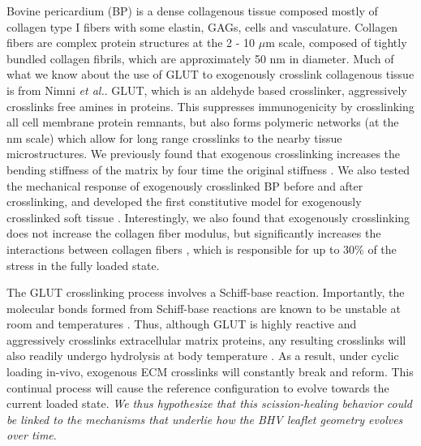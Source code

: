 	Bovine pericardium (BP) is a dense collagenous tissue composed mostly of collagen type I fibers with some elastin, GAGs, cells and vasculature. Collagen fibers are complex protein structures at the 2 - 10 $\mu$m scale, composed of tightly bundled collagen fibrils, which are approximately 50 nm in diameter. Much of what we know about the use of GLUT to exogenously crosslink collagenous tissue is from Nimni \textit{et al.}\cite{cheung_mechanism_1990, nimni_chemically_1987, cheung_mechanism_1985, gendler_toxic_1984, cheung_presence_1983, cheung_mechanism_1982, cheung_mechanism_1982b}. GLUT, which is an aldehyde based crosslinker, aggressively crosslinks free amines in proteins. This suppresses immunogenicity by crosslinking all cell membrane protein remnants, but also forms polymeric networks (at the nm scale) which allow for long range crosslinks to the nearby tissue microstructures. We previously found that exogenous crosslinking increases the bending stiffness of the matrix by four time the original stiffness \cite{mirnajafi_effects_2010}. We also tested the mechanical response of exogenously crosslinked BP before and after crosslinking, and developed the first constitutive model for exogenously crosslinked soft tissue \cite{sacks_novel_2016}. Interestingly, we also found that exogenously crosslinking does not increase the collagen fiber modulus, but significantly increases the interactions between collagen fibers \cite{sacks_novel_2016}, which is responsible for up to 30\% of the stress in the fully loaded state. 


	The GLUT crosslinking process involves a Schiff-base reaction. Importantly, the molecular bonds formed from Schiff-base reactions are known to be unstable at room and temperatures \cite{migneault_glutaraldehyde_2004, damink_glutaraldehyde_1995}. Thus, although GLUT is highly reactive and aggressively crosslinks extracellular matrix proteins, any resulting crosslinks will also readily undergo hydrolysis at body temperature \cite{migneault_glutaraldehyde_2004}. As a result, under cyclic loading in-vivo, exogenous ECM crosslinks will constantly break and reform. This continual process will cause the reference configuration to evolve towards the current loaded state. \emph{We thus hypothesize that this scission-healing behavior could be linked to the mechanisms that underlie how the BHV leaflet geometry evolves over time}.
	
